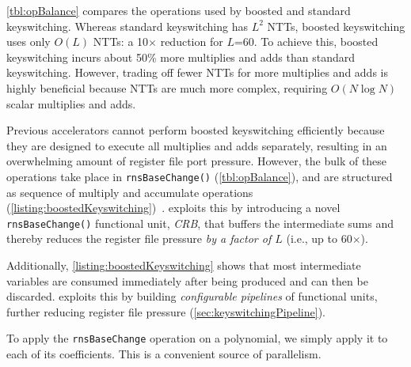 \tblOpBalance

\autoref{tbl:opBalance} compares the operations used by boosted and standard keyswitching.
Whereas standard keyswitching has $L^2$ NTTs, boosted keyswitching uses only $O(L)$ NTTs:
a 10$\times$ reduction for $L$=60. To achieve this, boosted keyswitching incurs about 50\%
more multiplies and adds than standard keyswitching.
However, trading off fewer NTTs for more multiplies and adds is highly beneficial
because NTTs are much more complex, requiring $O(N \log N)$ scalar multiplies and adds.

Previous accelerators cannot perform boosted keyswitching efficiently because
they are designed to execute all multiplies and adds separately, resulting in an
overwhelming amount of register file port pressure.
However, the bulk of these \mbox{operations} take place in \verb!rnsBaseChange()!
(\autoref{tbl:opBalance}), and are structured as sequence of multiply and accumulate
operations (\autoref{listing:boostedKeyswitching})~\cite{bajard:2016:full}.
\name exploits this by introducing a novel \verb!rnsBaseChange()! functional
unit, \emph{CRB}, that buffers the intermediate sums and thereby reduces the
register file pressure \emph{by a factor of $L$} (i.e., up to 60$\times$).

Additionally, \autoref{listing:boostedKeyswitching} shows that most intermediate
variables are consumed immediately after being produced and can then be discarded.
\name exploits this by building \emph{configurable pipelines} of functional units,
further reducing register file pressure (\autoref{sec:keyswitchingPipeline}).




 

To apply the \verb!rnsBaseChange! operation on a polynomial, we simply apply it to
each of its coefficients. This is a convenient source of parallelism.

